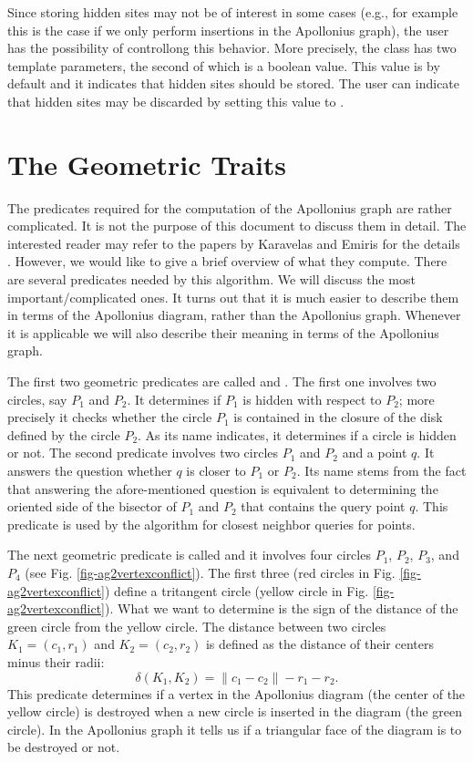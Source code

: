 Since storing hidden sites may not be of interest in some cases (e.g.,
for example this is the case if we only perform insertions in the
Apollonius graph), the user has the possibility of controllong this
behavior. More precisely, the class
 has two template
parameters, the second of which is a boolean value. This value is by
default  and it indicates that hidden sites should be
stored. The user can indicate that hidden sites may be discarded
by setting this value to .


\section{The Geometric Traits}
\label{sec:apollonius2-traits}

The predicates required for the computation of the Apollonius graph
are rather complicated. It is not the purpose of this document to
discuss them in detail. The interested reader may refer to the papers
by Karavelas and Emiris for the details
\cite{ke-ppawv-02,ke-rctac-03}. However, we would like to give a brief
overview of what they 
compute. There are several predicates needed by this algorithm. We
will discuss the most important/complicated ones. It turns out that
it is much easier to describe them in terms of the Apollonius diagram,
rather than the Apollonius graph. Whenever it is applicable we will also
describe their meaning in terms of the Apollonius graph.


The first two geometric predicates are called
 and . The first one
involves two circles, say $P_1$ and $P_2$. It determines if $P_1$ is
hidden with respect to $P_2$; more precisely it checks whether the
circle $P_1$ is contained in the closure of the disk defined by the
circle $P_2$. As its name indicates, it determines if a circle is
hidden or not. The second predicate involves two circles $P_1$ and
$P_2$ and a point $q$. It answers the question whether $q$ is closer
to $P_1$ or $P_2$. Its name stems from the fact that answering the
afore-mentioned question is equivalent to determining the oriented
side of the bisector of $P_1$ and $P_2$ that contains the query point
$q$. This predicate is used by the algorithm for closest neighbor
queries for points.


The next geometric predicate is called  and it
involves four circles $P_1$, $P_2$, $P_3$, and $P_4$ (see
Fig. \ref{fig-ag2vertexconflict}). The first three (red circles in
Fig. \ref{fig-ag2vertexconflict}) define a tritangent circle (yellow
circle in Fig. \ref{fig-ag2vertexconflict}). What we want to determine is
the sign of the distance of the green circle from the yellow
circle. The distance between two circles $K_1=(c_1,r_1)$ and
$K_2=(c_2, r_2)$ is defined as the distance of their centers minus
their radii:
\[   \delta(K_1, K_2) = \|c_1-c_2\|-r_1-r_2. \]
This predicate determines if a vertex in the Apollonius diagram
(the center of the yellow circle) is destroyed when a new circle is
inserted in the diagram (the green circle). In the Apollonius graph
it tells us if a triangular face of the diagram is to be destroyed or
not.

